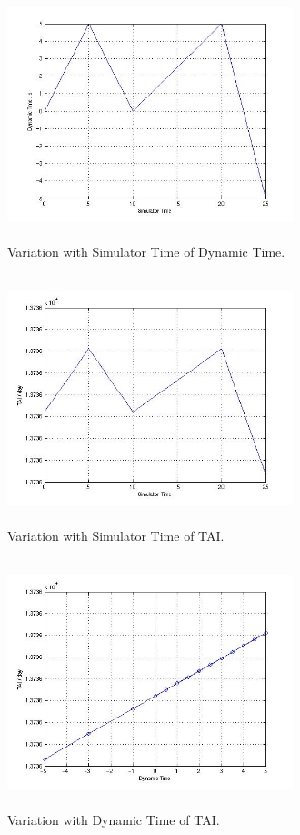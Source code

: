 \begin{description}
\begin{figure}[htp]
\begin{center}
\includegraphics[width=3.2736in,height=2.85in]{figures/sim2_dyn.jpg}
\caption{Variation with Simulator Time of Dynamic Time.}
\end{center}
\end{figure}

\begin{figure}[htp]
\begin{center}
\includegraphics[width=3.2736in,height=2.85in]{figures/sim2_tai.jpg}
\caption{Variation with Simulator Time of TAI.}
\end{center}
\end{figure}

\begin{figure}[htp]
\begin{center}
\includegraphics[width=3.2736in,height=2.85in]{figures/sim2_tai_dyn.jpg}
\caption{Variation with Dynamic Time of TAI.}
\end{center}
\end{figure}

\end{description}


